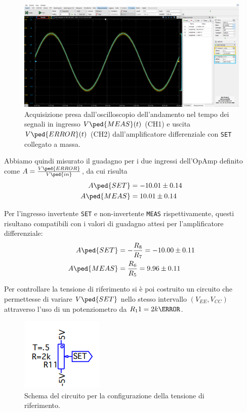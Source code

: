 \documentclass[10pt, a4paper, italian]{article}
\begin{document}
\begin{figure}[htbp]
    \centering
	\includegraphics[scale=0.4]{error.meas}
    \caption{Acquisizione presa dall'oscilloscopio dell'andamento nel tempo dei
	segnali in ingresso $V\ped{MEAS} (t)$ (CH1) e uscita $V\ped{ERROR} (t)$ (CH2)
	dall'amplificatore differenziale con \texttt{SET} collegato a massa.
    \label{fig: errmeas}}
\end{figure}

Abbiamo quindi misurato il guadagno per i due ingressi dell'OpAmp definito
come $A = \frac{V\ped{ERROR}}{V\ped{in}}$, da cui risulta
\begin{align*}
A\ped{SET} &= -10.01 \pm 0.14 \\
A\ped{MEAS} &= 10.01 \pm 0.14
\end{align*}

Per l'ingresso invertente \verb+SET+ e non-invertente \verb+MEAS+
rispettivamente, questi risultano compatibili con i valori di guadagno attesi
per l'amplificatore differenziale:
\begin{align*}
A\ped{SET} &= - \frac{R_8}{R_7} = -10.00 \pm 0.11 \\
A\ped{MEAS} &= \frac{R_6}{R_5} = 9.96 \pm 0.11
\end{align*}

Per controllare la tensione di riferimento si è poi costruito un circuito che
permettesse di variare $V\ped{SET}$ nello stesso intervallo
$(V_{EE}, V_{CC})$ attraverso l'uso di un potenziometro da $R_11 = 2 k\ohm$.
\begin{figure}[htbp]
    \centering
	\includegraphics[scale=0.7]{setgen}
    \caption{Schema del circuito per la configurazione della tensione di
    riferimento.
    \label{schm: setgen}}
\end{figure}
\end{document}
